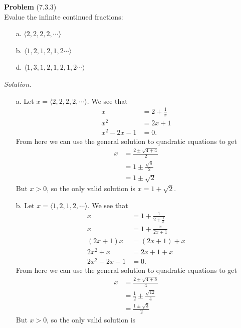 \documentclass[12 pt]{amsart}
\begin{document}
\phantom{\quad} \vfill
\noindent
\textbf{Problem} (7.3.3) \\[4ex]
  Evalue the infinite continued fractions:
	\begin{enumerate}
    \item[a.] 
       $\langle 2,2,2,2, \cdots \rangle$
    \item[b.] 
       $\langle 1,2,1,2,1,2 \cdots \rangle$
    \item[d.] 
       $\langle 1,3,1,2,1,2,1,2 \cdots \rangle$
	\end{enumerate}
\emph{Solution.} \\[2ex]
	\begin{enumerate}
		\item[a.]
      Let $x = \langle 2,2,2,2, \cdots \rangle$.
      We see that
      \begin{align*}
        x &= 2 + \frac{1}{x} \\
        x^2 &= 2x + 1 \\
        x^2 - 2x - 1 &= 0.
      \end{align*}
      From here we can use the general solution to 
      quadratic equations to get
      \begin{align*}
        x &= \frac{2 \pm \sqrt{4 + 4}}{2} \\
          &= 1 \pm \frac{\sqrt{8}}{2} \\
          &= 1 \pm \sqrt{2}
      \end{align*}
      But $x > 0$, so the only valid solution is 
      $x = 1 + \sqrt{2}$.
		\item[b.]
      Let $x = \langle 1,2,1,2, \cdots \rangle$.
      We see that
      \begin{align*}
        x &= 1 + \frac{1}{2 + \frac{1}{x}} \\
        x &= 1 + \frac{x}{2x + 1} \\
        (2x + 1)x &= (2x + 1) + x  \\
        2x^2 + x &= 2x + 1 + x \\
        2x^2 - 2x - 1 &= 0.
      \end{align*}
      From here we can use the general solution to 
      quadratic equations to get
      \begin{align*}
        x &= \frac{2 \pm \sqrt{4 + 8}}{4}\\
          &= \frac{1}{2} \pm \frac{\sqrt{12}}{4} \\
          &= \frac{1 \pm \sqrt{3}}{2}
      \end{align*}
      But $x > 0$, so the only valid solution is 

\end{enumerate}
\end{document}
